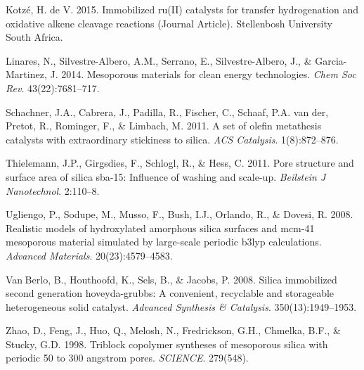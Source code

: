 \documentclass[]{article}
\begin{document}
\leavevmode\hypertarget{ref-RN90}{}%
Kotzé, H. de V. 2015. Immobilized ru(II) catalysts for transfer
hydrogenation and oxidative alkene cleavage reactions (Journal Article).
Stellenbosh University South Africa.

\leavevmode\hypertarget{ref-RN87}{}%
Linares, N., Silvestre-Albero, A.M., Serrano, E., Silvestre-Albero, J.,
\& Garcia-Martinez, J. 2014. Mesoporous materials for clean energy
technologies. \emph{Chem Soc Rev}. 43(22):7681--717.

\leavevmode\hypertarget{ref-RN85}{}%
Schachner, J.A., Cabrera, J., Padilla, R., Fischer, C., Schaaf, P.A. van
der, Pretot, R., Rominger, F., \& Limbach, M. 2011. A set of olefin
metathesis catalysts with extraordinary stickiness to silica. \emph{ACS
Catalysis}. 1(8):872--876.

\leavevmode\hypertarget{ref-RN92}{}%
Thielemann, J.P., Girgsdies, F., Schlogl, R., \& Hess, C. 2011. Pore
structure and surface area of silica sba-15: Influence of washing and
scale-up. \emph{Beilstein J Nanotechnol}. 2:110--8.

\leavevmode\hypertarget{ref-RN13}{}%
Ugliengo, P., Sodupe, M., Musso, F., Bush, I.J., Orlando, R., \& Dovesi,
R. 2008. Realistic models of hydroxylated amorphous silica surfaces and
mcm-41 mesoporous material simulated by large-scale periodic b3lyp
calculations. \emph{Advanced Materials}. 20(23):4579--4583.

\leavevmode\hypertarget{ref-RN74}{}%
Van Berlo, B., Houthoofd, K., Sels, B., \& Jacobs, P. 2008. Silica
immobilized second generation hoveyda-grubbs: A convenient, recyclable
and storageable heterogeneous solid catalyst. \emph{Advanced Synthesis
\& Catalysis}. 350(13):1949--1953.

\leavevmode\hypertarget{ref-RN69}{}%
Zhao, D., Feng, J., Huo, Q., Melosh, N., Fredrickson, G.H., Chmelka,
B.F., \& Stucky, G.D. 1998. Triblock copolymer syntheses of mesoporous
silica with periodic 50 to 300 angstrom pores. \emph{SCIENCE}. 279(548).
\end{document}
